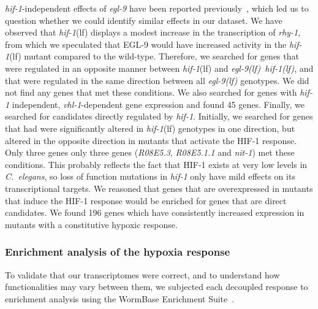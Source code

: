 \documentclass[9pt,twocolumn,twoside]{pnas-new}
\newcommand{\cel}{\emph{C.~elegans}}
\newcommand{\gene}[1]{\emph{#1}}
\newcommand{\egl}{\emph{\mbox{egl-9}(lf)}}
\newcommand{\vhl}{\emph{\mbox{vhl-1}(lf)}}
\newcommand{\eglhif}{\emph{\mbox{egl-9(lf)}~\mbox{hif-1(lf)}}}
\newcommand{\hif}{\emph{\mbox{hif-1}}(lf)}
\newcommand{\eglp}{EGL-9}
\newcommand{\hifp}{HIF-1}
\newcommand{\egltargets}{126}
\newcommand{\vhltargets}{45} %
\newcommand{\hiftargets}{196}
\begin{document}
\gene{hif-1}-independent effects of \gene{egl-9} have been reported
previously~\cite{Park2012}, which led us to question whether we could identify
similar effects in our dataset. We have observed that \hif{} displays a modest
increase in the transcription of \gene{rhy-1}, from which we speculated that
\eglp{} would have increased activity in the \hif{} mutant compared to the wild-type.
Therefore, we searched for genes that were regulated in an opposite manner between
\hif{} and \eglhif{}, and that were regulated in the same direction between
all \egl{} genotypes. We did not find any genes that met these conditions.
We also searched for genes with \gene{hif-1} independent, \gene{vhl-1}-dependent gene
expression and found \vhltargets{} genes.
Finally, we searched for candidates directly regulated by \gene{hif-1}. Initially, we
searched for genes that had were significantly altered in \hif{} genotypes in one
direction, but altered in the opposite direction in mutants that activate the
\hifp{} response. Only three genes
only three genes (\emph{R08E5.3}, \emph{R08E5.1.1} and \emph{nit-1}) met these
conditions. This probably reflects the fact that \hifp{} exists at very low
levels in \cel{}, so loss of function mutations in \gene{hif-1} only have mild
effects on its transcriptional targets. We reasoned that genes
that are overexpressed in mutants that induce the \hifp{} response would be enriched
for genes that are direct candidates.  We found \hiftargets{}  genes which have
consistently increased expression in mutants with a constitutive hypoxic response.

\subsubsection*{Enrichment analysis of the hypoxia response}
\label{sub:ea_hypoxia}
To validate that our transcriptomes were correct, and to understand how
functionalities may vary between them, we subjected each decoupled response to
enrichment analysis using the WormBase Enrichment Suite~\cite{Angeles-Albores2016,
Angeles-Albores2016b}.
\end{document}
